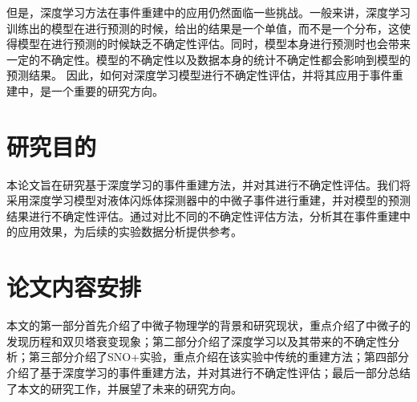 但是，深度学习方法在事件重建中的应用仍然面临一些挑战。一般来讲，深度学习训练出的模型在进行预测的时候，给出的结果是一个单值，而不是一个分布，这使得模型在进行预测的时候缺乏不确定性评估。同时，模型本身进行预测时也会带来一定的不确定性。模型的不确定性以及数据本身的统计不确定性都会影响到模型的预测结果。
因此，如何对深度学习模型进行不确定性评估，并将其应用于事件重建中，是一个重要的研究方向。


\section{研究目的}

本论文旨在研究基于深度学习的事件重建方法，并对其进行不确定性评估。我们将采用深度学习模型对液体闪烁体探测器中的中微子事件进行重建，并对模型的预测结果进行不确定性评估。通过对比不同的不确定性评估方法，分析其在事件重建中的应用效果，为后续的实验数据分析提供参考。

\section{论文内容安排}

本文的第一部分首先介绍了中微子物理学的背景和研究现状，重点介绍了中微子的发现历程和双贝塔衰变现象；第二部分介绍了深度学习以及其带来的不确定性分析；第三部分介绍了SNO+实验，重点介绍在该实验中传统的重建方法；第四部分介绍了基于深度学习的事件重建方法，并对其进行不确定性评估；最后一部分总结了本文的研究工作，并展望了未来的研究方向。